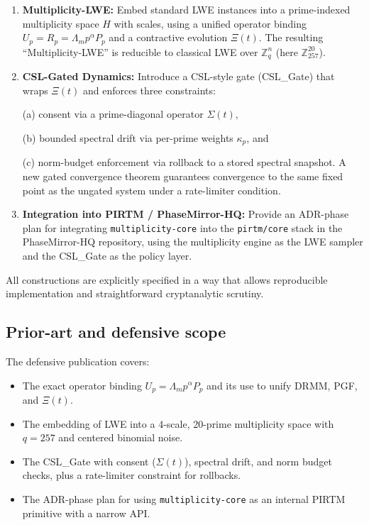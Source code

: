 \documentclass[11pt]{article}
\begin{document}
\begin{enumerate}
    \item \textbf{Multiplicity-LWE:} Embed standard LWE instances into a
    prime-indexed multiplicity space $H$ with scales, using a unified operator
    binding $U_p = R_p = \Lambda_m p^\alpha P_p$ and a contractive evolution
    $\Xi(t)$.\cite{pqc-lwe} The resulting ``Multiplicity-LWE'' is reducible
    to classical LWE over $\mathbb{Z}_q^n$ (here $\mathbb{Z}_{257}^{20}$).

    \item \textbf{CSL-Gated Dynamics:} Introduce a CSL-style gate (CSL\_Gate)
    that wraps $\Xi(t)$ and enforces three constraints:

    (a) consent via a prime-diagonal operator $\Sigma(t)$,

    (b) bounded spectral drift via per-prime weights ${\kappa_p}$, and

    (c) norm-budget enforcement via rollback to a stored spectral snapshot.
    A new gated convergence theorem guarantees convergence to the same fixed
    point as the ungated system under a rate-limiter condition.

    \item \textbf{Integration into PIRTM / PhaseMirror-HQ:} Provide an
    ADR-phase plan for integrating \texttt{multiplicity-core} into the
    \texttt{pirtm/core} stack in the PhaseMirror-HQ repository, using the
    multiplicity engine as the LWE sampler and the CSL\_Gate as the policy
    layer.
\end{enumerate}

All constructions are explicitly specified in a way that allows reproducible
implementation and straightforward cryptanalytic scrutiny.

\subsection{Prior-art and defensive scope}

The defensive publication covers:

\begin{itemize}
    \item The exact operator binding $U_p = \Lambda_m p^\alpha P_p$ and its
    use to unify DRMM, PGF, and $\Xi(t)$.

    \item The embedding of LWE into a 4-scale, 20-prime multiplicity space
    with $q = 257$ and centered binomial noise.

    \item The CSL\_Gate with consent ($\Sigma(t)$), spectral drift, and norm
    budget checks, plus a rate-limiter constraint for rollbacks.

    \item The ADR-phase plan for using \texttt{multiplicity-core} as an
    internal PIRTM primitive with a narrow API.
\end{itemize}
\end{document}
